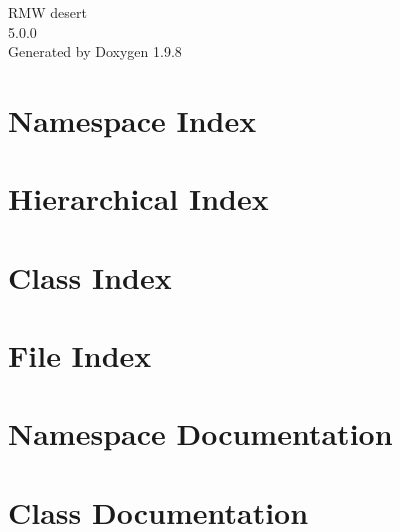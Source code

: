 \documentclass[twoside]{book}
\newcommand{\+}{\discretionary{\mbox{\scriptsize$\hookleftarrow$}}{}{}}
\newcommand{\clearemptydoublepage}{%
    \newpage{\pagestyle{empty}\cleardoublepage}%
  }
\begin{document}
  \raggedbottom
    \hypersetup{pageanchor=false,
                bookmarksnumbered=true,
                pdfencoding=unicode
               }
  \begin{titlepage}
  \vspace*{7cm}
  \begin{center}%
  {\Large RMW desert}\\
  [1ex]\large 5.\+0.\+0 \\
  \vspace*{1cm}
  {\large Generated by Doxygen 1.9.8}\\
  \end{center}
  \end{titlepage}
  \clearemptydoublepage
  \tableofcontents
  \clearemptydoublepage
  \hypersetup{pageanchor=true}
\chapter{Namespace Index}

\chapter{Hierarchical Index}

\chapter{Class Index}

\chapter{File Index}

\chapter{Namespace Documentation}



\chapter{Class Documentation}



















\end{document}
